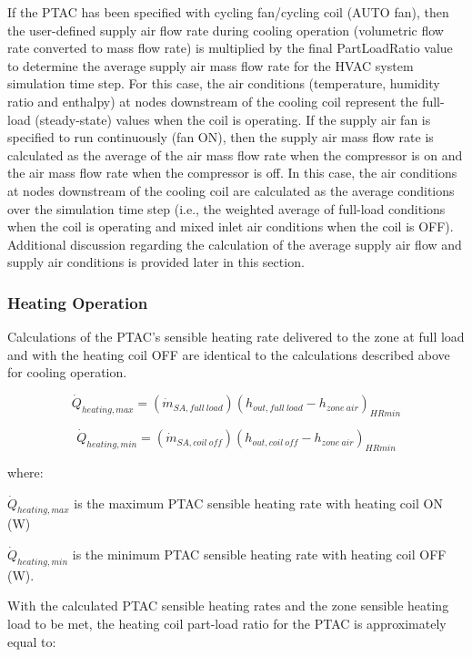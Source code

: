 If the PTAC has been specified with cycling fan/cycling coil (AUTO fan), then the user-defined supply air flow rate during cooling operation (volumetric flow rate converted to mass flow rate) is multiplied by the final PartLoadRatio value to determine the average supply air mass flow rate for the HVAC system simulation time step. For this case, the air conditions (temperature, humidity ratio and enthalpy) at nodes downstream of the cooling coil represent the full-load (steady-state) values when the coil is operating. If the supply air fan is specified to run continuously (fan ON), then the supply air mass flow rate is calculated as the average of the air mass flow rate when the compressor is on and the air mass flow rate when the compressor is off. In this case, the air conditions at nodes downstream of the cooling coil are calculated as the average conditions over the simulation time step (i.e., the weighted average of full-load conditions when the coil is operating and mixed inlet air conditions when the coil is OFF). Additional discussion regarding the calculation of the average supply air flow and supply air conditions is provided later in this section.

\subsubsection{Heating Operation}\label{heating-operation-001}

Calculations of the PTAC's sensible heating rate delivered to the zone at full load and with the heating coil OFF are identical to the calculations described above for cooling operation.

\begin{equation}
  \dot{Q}_{heating,max} = \left( \dot{m}_{SA,full~load} \right) \left( h_{out,full~load} - {h_{zone~air}} \right)_{HRmin}
\end{equation}

\begin{equation}
  \dot{Q}_{heating,min} = \left( \dot{m}_{SA,coil~off} \right) \left( h_{out,coil~off} - h_{zone~air} \right)_{HRmin}
\end{equation}

where:

\(\dot{Q}_{heating,max}\) is the maximum PTAC sensible heating rate with heating coil ON (W)

\(\dot{Q}_{heating,min}\) is the minimum PTAC sensible heating rate with heating coil OFF (W).

With the calculated PTAC sensible heating rates and the zone sensible heating load to be met, the heating coil part-load ratio for the PTAC is approximately equal to:

